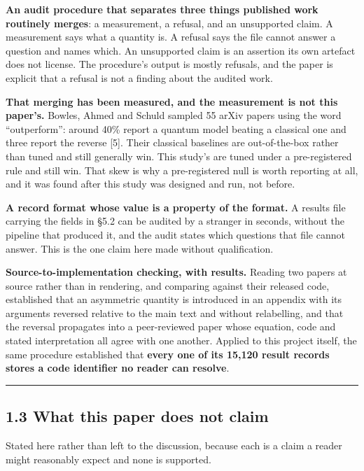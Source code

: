 \documentclass[
  10pt,
]{article}
\newcounter{none} %
\begin{document}
\textbf{An audit procedure that separates three things published work
routinely merges}: a measurement, a refusal, and an unsupported claim. A
measurement says what a quantity is. A refusal says the file cannot
answer a question and names which. An unsupported claim is an assertion
its own artefact does not license. The procedure's output is mostly
refusals, and the paper is explicit that a refusal is not a finding
about the audited work.

\textbf{That merging has been measured, and the measurement is not this
paper's.} Bowles, Ahmed and Schuld sampled 55 arXiv papers using the
word ``outperform'': around 40\% report a quantum model beating a
classical one and three report the reverse {[}5{]}. Their classical
baselines are out-of-the-box rather than tuned and still generally win.
This study's are tuned under a pre-registered rule and still win. That
skew is why a pre-registered null is worth reporting at all, and it was
found after this study was designed and run, not before.

\textbf{A record format whose value is a property of the format.} A
results file carrying the fields in \S{}5.2 can be audited by a stranger
in seconds, without the pipeline that produced it, and the audit states
which questions that file cannot answer. This is the one claim here made
without qualification.

\textbf{Source-to-implementation checking, with results.} Reading two
papers at source rather than in rendering, and comparing against their
released code, established that an asymmetric quantity is introduced in
an appendix with its arguments reversed relative to the main text and
without relabelling, and that the reversal propagates into a
peer-reviewed paper whose equation, code and stated interpretation all
agree with one another. Applied to this project itself, the same
procedure established that \textbf{every one of its 15,120 result
records stores a code identifier no reader can resolve}.

\begin{center}\rule{0.5\linewidth}{0.5pt}\end{center}

\subsection{1.3 What this paper does not
claim}\label{what-this-paper-does-not-claim}

Stated here rather than left to the discussion, because each is a claim
a reader might reasonably expect and none is supported.
\end{document}
